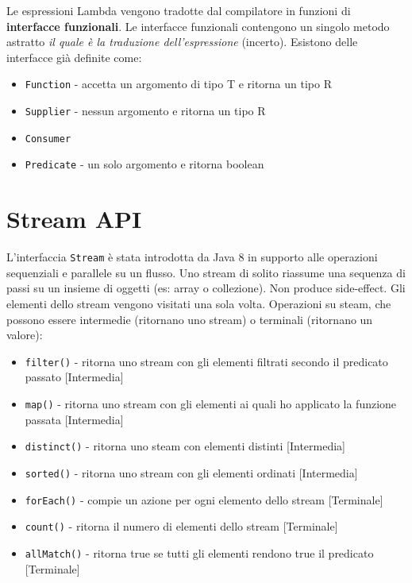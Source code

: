 Le espressioni Lambda vengono tradotte dal compilatore in funzioni di \textbf{interfacce funzionali}. Le interfacce funzionali contengono un singolo metodo astratto \textit{il quale è la traduzione dell'espressione} (incerto). Esistono delle interfacce già definite come:
\begin{itemize}
\item \texttt{Function} - accetta un argomento di tipo T e ritorna un tipo R
\item \texttt{Supplier} - nessun argomento e ritorna un tipo R
\item \texttt{Consumer} 
\item \texttt{Predicate} - un solo argomento e ritorna boolean 
\end{itemize}

\section{Stream API}
L'interfaccia \texttt{Stream} è stata introdotta da Java 8 in supporto alle operazioni sequenziali e parallele su un flusso. Uno stream di solito riassume una sequenza di passi su un insieme di oggetti (es: array o collezione). Non produce side-effect. Gli elementi dello stream vengono visitati una sola volta. Operazioni su steam, che possono essere intermedie (ritornano uno stream) o terminali (ritornano un valore):
\begin{itemize}
\item \texttt{filter()} - ritorna uno stream con gli elementi filtrati secondo il predicato passato [Intermedia]
\item \texttt{map()} - ritorna uno stream con gli elementi ai quali ho applicato la funzione passata [Intermedia]
\item \texttt{distinct()} - ritorna uno steam con elementi distinti [Intermedia]
\item \texttt{sorted()} - ritorna uno stream con gli elementi ordinati [Intermedia]
\item \texttt{forEach()} - compie un azione per ogni elemento dello stream [Terminale]
\item \texttt{count()} - ritorna il numero di elementi dello stream [Terminale]
\item \texttt{allMatch()} - ritorna true se tutti gli elementi rendono true il predicato [Terminale]
\end{itemize}